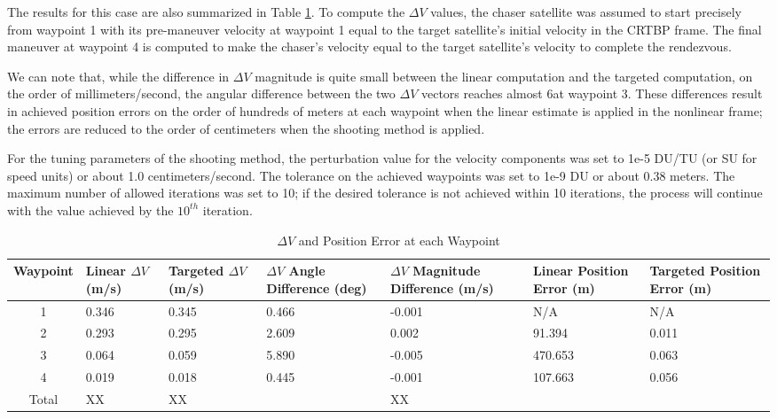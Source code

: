 \documentclass[a4paper]{article}
\begin{document}
The results for this case are also summarized in Table \ref{tab:Results_1}.  To compute the \(\Delta V\) values, the chaser satellite was assumed to start precisely from waypoint 1 with its pre-maneuver velocity at waypoint 1 equal to the target satellite's initial velocity in the CRTBP frame.  The final maneuver at waypoint 4 is computed to make the chaser's velocity equal to the target satellite's velocity to complete the rendezvous.

We can note that, while the difference in \(\Delta V\) magnitude is quite small between the linear computation and the targeted computation, on the order of millimeters/second, the angular difference between the two \(\Delta V\) vectors reaches almost 6\textdegree at waypoint 3.  These differences result in achieved position errors on the order of hundreds of meters at each waypoint when the linear estimate is applied in the nonlinear frame; the errors are reduced to the order of centimeters when the shooting method is applied.

For the tuning parameters of the shooting method, the perturbation value for the velocity components was set to 1e-5 DU/TU (or SU for speed units) or about 1.0 centimeters/second.  The tolerance on the achieved waypoints was set to 1e-9 DU or about 0.38 meters.  The maximum number of allowed iterations was set to 10; if the desired tolerance is not achieved within 10 iterations, the process will continue with the value achieved by the \(10^{th}\) iteration.

\begin{table}[h] \label{tab:Results_1}
	\begin{center}
		\begin{tabular}{c p{1cm} p{1cm} p{1.5cm} p{1.5cm} p{1.5cm} p{1.5cm}}
			\toprule
			Waypoint   & Linear \(\Delta V\) (m/s) & Targeted \(\Delta V\) (m/s) & \(\Delta V\) Angle Difference (deg) & \(\Delta V\) Magnitude Difference (m/s) & Linear Position Error (m) & Targeted Position Error (m) \\
			\midrule
			1 & 0.346 &	0.345 &	0.466 &	-0.001 &	N/A &	N/A \\
			2 & 0.293 &	0.295 &	2.609 &	0.002 &	91.394 &	0.011 \\
			3 & 0.064 &	0.059 &	5.890 &	-0.005 &	470.653 &	0.063 \\
			4 & 0.019 &	0.018 &	0.445 &	-0.001 &	107.663 &	0.056 \\
			Total & XX  & XX &  & XX &  & \\
			\bottomrule
		\end{tabular}
		\caption{\(\Delta V\) and Position Error at each Waypoint}
	\end{center}
\end{table}
\end{document}
